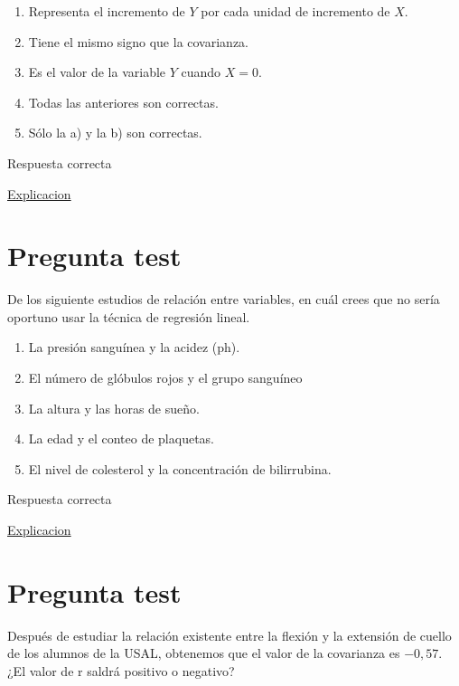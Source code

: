 \documentclass[
]{book}
\providecommand{\tightlist}{%
  \setlength{\itemsep}{0pt}\setlength{\parskip}{0pt}}
\begin{document}
\begin{enumerate}
\def\labelenumi{\alph{enumi})}
\tightlist
\item
  Representa el incremento de \(Y\) por cada unidad de incremento de \(X\).
\item
  Tiene el mismo signo que la covarianza.
\item
  Es el valor de la variable \(Y\) cuando \(X=0\).
\item
  Todas las anteriores son correctas.
\item
  Sólo la a) y la b) son correctas.
\end{enumerate}

Respuesta correcta

\href{https://1fjmanzano.github.io/bioestadistica/relaci\%C3\%B3n-entre-variables-nume\%CC\%81ricas.html\#regresio\%CC\%81n-lineal}{Explicacion}

\hypertarget{pregunta-test-137}{%
\section{Pregunta test}\label{pregunta-test-137}}

De los siguiente estudios de relación entre variables, en cuál crees que no sería oportuno usar la técnica de regresión lineal.

\begin{enumerate}
\def\labelenumi{\alph{enumi})}
\tightlist
\item
  La presión sanguínea y la acidez (ph).
\item
  El número de glóbulos rojos y el grupo sanguíneo
\item
  La altura y las horas de sueño.
\item
  La edad y el conteo de plaquetas.
\item
  El nivel de colesterol y la concentración de bilirrubina.
\end{enumerate}

Respuesta correcta

\href{https://es.cochrane.org/es/divulgacion/pensamiento-critico/correlacion-no-implica-causalidad}{Explicacion}

\hypertarget{pregunta-test-138}{%
\section{Pregunta test}\label{pregunta-test-138}}

Después de estudiar la relación existente entre la flexión y la extensión de cuello de los alumnos de la USAL, obtenemos que el valor de la covarianza es \(-0,57\). ¿El valor de r saldrá positivo o negativo?
\end{document}
